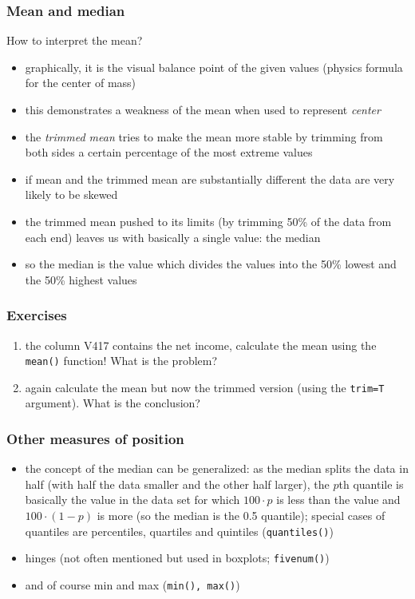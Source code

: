 \documentclass[xcolor={table}]{beamer}
\begin{document}
\begin{frame}[allowframebreaks]\frametitle{Mean and median}
How to interpret the mean?
  \begin{itemize}
  \item graphically, it is the visual balance point of the given values (physics formula for the center of mass)
  \item this demonstrates a weakness of the mean when used to represent \textit{center}
  \item the \textit{trimmed mean} tries to make the mean more stable by trimming from both sides a certain percentage of the most extreme values
  \item if mean and the trimmed mean are substantially different the data are very likely to be skewed
  \item the trimmed mean pushed to its limits (by trimming 50\% of the data from each end) leaves us with basically a single value: the median
  \item so the median is the value which divides the values into the 50\% lowest and the 50\% highest values
  \end{itemize}  
\end{frame}

\begin{frame}\frametitle{Exercises} 
  \begin{enumerate}
  \item the column V417 contains the net income, calculate the mean using the \texttt{mean()} function! What is the problem?
  \item again calculate the mean but now the trimmed version (using the \texttt{trim=T} argument). What is the conclusion?
  \end{enumerate}
\end{frame}


\begin{frame}\frametitle{Other measures of position}
  \begin{itemize}
  \item the concept of the median can be generalized: as the median splits the data in half (with half the data smaller and the other half larger), the $p$th quantile is basically the value in the data set for which $100\cdot p$  is less than the value and $100 \cdot (1-p)$ is more (so the median is the 0.5 quantile); special cases of quantiles are percentiles, quartiles and quintiles (\texttt{quantiles()})
  \item hinges (not often mentioned but used in boxplots; \texttt{fivenum()})
  \item and of course min and max (\texttt{min(), max()})
  \end{itemize}  
\end{frame}
\end{document}
